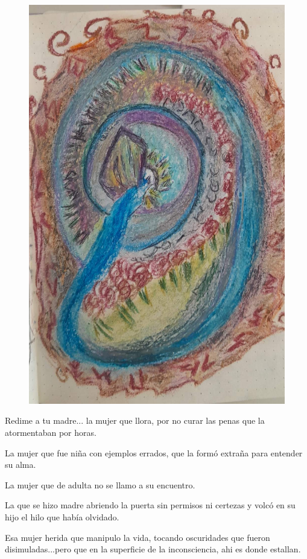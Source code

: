 \documentclass[12pt, a4paper, twoside]{book} %
\begin{document}
\begin{figure}[H]
	\centering
	\includegraphics[width=\textwidth]{./images/1f81324dd8b935.jpg}
\end{figure}

Redime a tu madre...
la mujer que llora, por no curar las penas que la atormentaban  por horas.

La mujer que fue niña con ejemplos errados, que la formó extraña para entender su alma.

La mujer que de adulta no se llamo a su encuentro.

La que se hizo madre abriendo la puerta sin permisos ni certezas y volcó en su hijo el hilo que había olvidado.

Esa mujer herida que manipulo la vida, tocando oscuridades que fueron disimuladas...pero que en la superficie de la inconsciencia, ahi es donde estallan.
\end{document}
